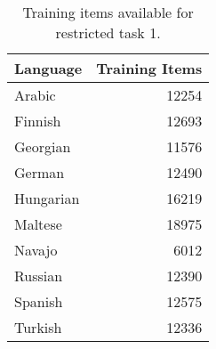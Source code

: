 \documentclass[11pt]{article}
\begin{document}
\begin{table}
\begin{center}
	\begin{tabular}{|l r|}
    \hline
    Language	&	Training Items \\\hline
    Arabic       &      12254\\
    Finnish      &      12693\\
    Georgian     &      11576\\
    German       &      12490\\
    Hungarian    &      16219\\
    Maltese      &      18975\\
    Navajo       &       6012\\
    Russian      &      12390\\
    Spanish      &      12575\\
    Turkish      &      12336\\\hline
    \end{tabular}
    \caption{Training items available for restricted task 1.}
    \label{tab:training}
\end{center}
\end{table}

\end{document}
